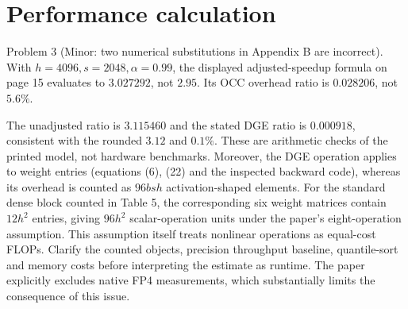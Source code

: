 \documentclass[10pt]{article}
\begin{document}
\section*{Performance calculation}
Problem 3 (Minor: two numerical substitutions in Appendix B are incorrect).  With \(h=4096,s=2048,\alpha=0.99\), the displayed adjusted-speedup formula on page 15 evaluates to \(3.027292\), not \(2.95\). Its OCC overhead ratio is \(0.028206\), not \(5.6\%\).\par
The unadjusted ratio is \(3.115460\) and the stated DGE ratio is \(0.000918\), consistent with the rounded \(3.12\) and \(0.1\%\). These are arithmetic checks of the printed model, not hardware benchmarks. Moreover, the DGE operation applies to weight entries (equations (6), (22) and the inspected backward code), whereas its overhead is counted as \(96bsh\) activation-shaped elements. For the standard dense block counted in Table 5, the corresponding six weight matrices contain \(12h^2\) entries, giving \(96h^2\) scalar-operation units under the paper’s eight-operation assumption. This assumption itself treats nonlinear operations as equal-cost FLOPs. Clarify the counted objects, precision throughput baseline, quantile-sort and memory costs before interpreting the estimate as runtime. The paper explicitly excludes native FP4 measurements, which substantially limits the consequence of this issue.\par
\end{document}
